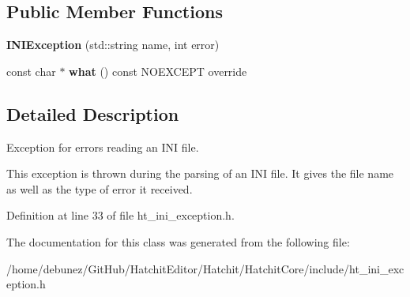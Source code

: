 \subsection*{Public Member Functions}
\begin{DoxyCompactItemize}
\item 
{\bfseries I\+N\+I\+Exception} (std\+::string name, int error)\hypertarget{classHatchit_1_1Core_1_1INIException_a586d5a44306c53f42adc5453b06f7f5f}{}\label{classHatchit_1_1Core_1_1INIException_a586d5a44306c53f42adc5453b06f7f5f}

\item 
const char $\ast$ {\bfseries what} () const N\+O\+E\+X\+C\+E\+PT override\hypertarget{classHatchit_1_1Core_1_1INIException_a789a6382958ad24e50c0975a298c46a7}{}\label{classHatchit_1_1Core_1_1INIException_a789a6382958ad24e50c0975a298c46a7}

\end{DoxyCompactItemize}


\subsection{Detailed Description}
Exception for errors reading an I\+NI file. 

This exception is thrown during the parsing of an I\+NI file. It gives the file name as well as the type of error it received. 

Definition at line 33 of file ht\+\_\+ini\+\_\+exception.\+h.



The documentation for this class was generated from the following file\+:\begin{DoxyCompactItemize}
\item 
/home/debunez/\+Git\+Hub/\+Hatchit\+Editor/\+Hatchit/\+Hatchit\+Core/include/ht\+\_\+ini\+\_\+exception.\+h\end{DoxyCompactItemize}

